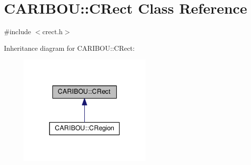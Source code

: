 \section{C\+A\+R\+I\+B\+OU\+:\+:C\+Rect Class Reference}
\label{class_c_a_r_i_b_o_u_1_1_c_rect}


{\ttfamily \#include $<$crect.\+h$>$}



Inheritance diagram for C\+A\+R\+I\+B\+OU\+:\+:C\+Rect\+:\nopagebreak
\begin{figure}[H]
\begin{center}
\leavevmode
\includegraphics[width=187pt]{class_c_a_r_i_b_o_u_1_1_c_rect__inherit__graph}
\end{center}
\end{figure}
